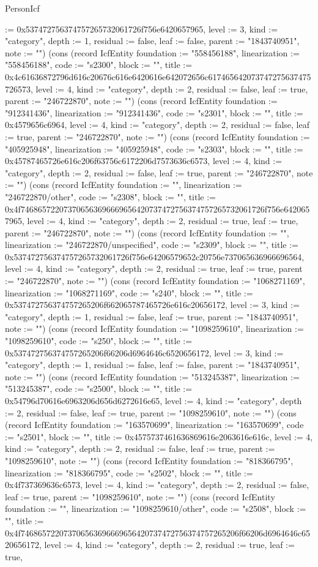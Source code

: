 \begin{lexlean}{PersonIcf}
\begin{semanticmodule}
{:= 0x537472756374757265732061726f756e6420657965, level := 3, kind := "category", depth := 1, residual := false, leaf := false, parent := "1843740951", note := ""}) (cons (record IcfEntity {foundation := "558456188", linearization := "558456188", code := "s2300", block := "", title := 0x4c61636872796d616c20676c616e6420616e642072656c617465642073747275637475726573, level := 4, kind := "category", depth := 2, residual := false, leaf := true, parent := "246722870", note := ""}) (cons (record IcfEntity {foundation := "912341436", linearization := "912341436", code := "s2301", block := "", title := 0x4579656c6964, level := 4, kind := "category", depth := 2, residual := false, leaf := true, parent := "246722870", note := ""}) (cons (record IcfEntity {foundation := "405925948", linearization := "405925948", code := "s2303", block := "", title := 0x45787465726e616c206f63756c6172206d7573636c6573, level := 4, kind := "category", depth := 2, residual := false, leaf := true, parent := "246722870", note := ""}) (cons (record IcfEntity {foundation := "", linearization := "246722870/other", code := "s2308", block := "", title := 0x4f746865722073706563696669656420737472756374757265732061726f756e6420657965, level := 4, kind := "category", depth := 2, residual := true, leaf := true, parent := "246722870", note := ""}) (cons (record IcfEntity {foundation := "", linearization := "246722870/unspecified", code := "s2309", block := "", title := 0x537472756374757265732061726f756e64206579652c20756e737065636966696564, level := 4, kind := "category", depth := 2, residual := true, leaf := true, parent := "246722870", note := ""}) (cons (record IcfEntity {foundation := "1068271169", linearization := "1068271169", code := "s240", block := "", title := 0x537472756374757265206f662065787465726e616c20656172, level := 3, kind := "category", depth := 1, residual := false, leaf := true, parent := "1843740951", note := ""}) (cons (record IcfEntity {foundation := "1098259610", linearization := "1098259610", code := "s250", block := "", title := 0x537472756374757265206f66206d6964646c6520656172, level := 3, kind := "category", depth := 1, residual := false, leaf := false, parent := "1843740951", note := ""}) (cons (record IcfEntity {foundation := "513245387", linearization := "513245387", code := "s2500", block := "", title := 0x54796d70616e6963206d656d6272616e65, level := 4, kind := "category", depth := 2, residual := false, leaf := true, parent := "1098259610", note := ""}) (cons (record IcfEntity {foundation := "163570699", linearization := "163570699", code := "s2501", block := "", title := 0x4575737461636869616e2063616e616c, level := 4, kind := "category", depth := 2, residual := false, leaf := true, parent := "1098259610", note := ""}) (cons (record IcfEntity {foundation := "818366795", linearization := "818366795", code := "s2502", block := "", title := 0x4f737369636c6573, level := 4, kind := "category", depth := 2, residual := false, leaf := true, parent := "1098259610", note := ""}) (cons (record IcfEntity {foundation := "", linearization := "1098259610/other", code := "s2508", block := "", title := 0x4f746865722073706563696669656420737472756374757265206f66206d6964646c6520656172, level := 4, kind := "category", depth := 2, residual := true, leaf := true, }
\end{semanticmodule}
\end{lexlean}
